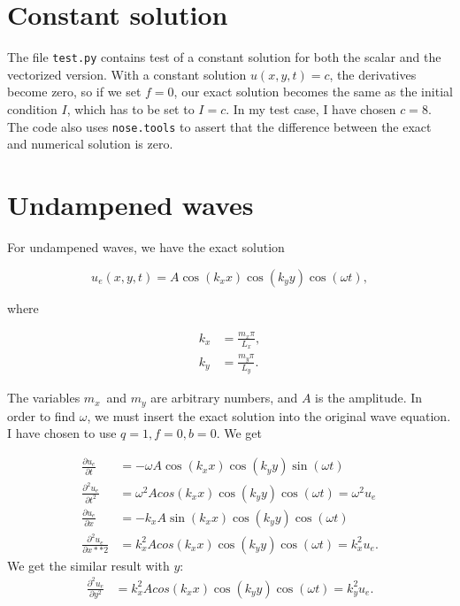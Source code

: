 \documentclass[10pt, a4paper]{amsart}
\numberwithin{figure}{section}
\numberwithin{table}{section}
\begin{document}
\section{Constant solution}

The file \texttt{test.py} contains test of a constant solution for both the
scalar and the vectorized version. With a constant solution $u(x,y,t) = c$, the derivatives
become zero, so if we set $f = 0$, our exact solution becomes the same as the
initial condition $I$, which has to be set to $I=c$. In my test case, I have
chosen $c=8$. The code also uses \texttt{nose.tools} to assert that the
difference between the exact and numerical solution is zero.


\section{Undampened waves}

For undampened waves, we have the exact solution

\begin{equation}
    u_e(x, y, t) = A \cos(k_x x) \cos (k_y y) \cos (\omega t),
\end{equation}

where

\begin{align}
    k_x &= \frac{m_x \pi}{L_x},\\
    k_y &= \frac{m_y \pi}{L_y}.
\end{align}

The variables $m_x$ and $m_y$ are arbitrary numbers, and $A$ is the
amplitude. In order to find $\omega$, we must insert the exact solution into
the original wave equation. I have chosen to use $q=1, f=0, b=0$. We get

\begin{align}
    \frac{\partial u_e}{\partial t} &= - \omega A \cos(k_x x) \cos(k_y y) \sin
    (\omega t)\\
    \frac{\partial^2 u_e}{\partial t^2} &= \omega^2 A cos(k_x x) \cos (k_y y)
    \cos (\omega t) = \omega^2 u_e\\
    \frac{\partial u_e}{\partial x} &= -k_x A \sin(k_x x) \cos(k_y y) \cos
    (\omega t)\\
    \frac{\partial^2 u_e}{\partial x**2} &= k_x^2 A cos (k_x x) \cos(k_y y)
    \cos (\omega t) = k_x^2 u_e.
\end{align}
We get the similar result with $y$:
\begin{align}
    \frac{\partial^2 u_e}{\partial y^2} &= k_x^2 A cos (k_x x) \cos(k_y y)
    \cos (\omega t) = k_y^2 u_e.
\end{align}
\end{document}

